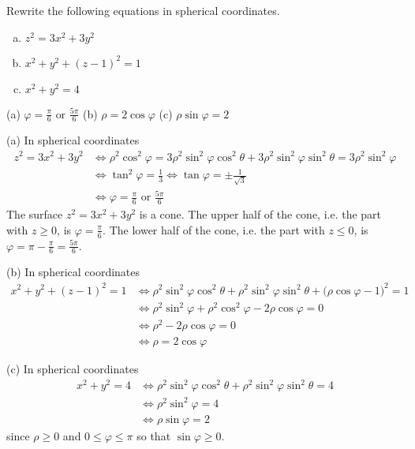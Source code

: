 \begin{question}
Rewrite the following equations in spherical coordinates.
\begin{enumerate}[(a)]
\item $z^2=3x^2+3y^2$
\item $x^2+y^2+(z-1)^2=1$
\item $x^2+y^2=4$
\end{enumerate}

\end{question}

%

\begin{answer}
(a) $\varphi=\frac{\pi}{6}\text{ or }\frac{5\pi}{6}$\qquad
(b) $\rho=2\cos\varphi$\qquad
(c) $\rho\sin\varphi=2$
\end{answer}

\begin{solution}
(a) In spherical coordinates
\begin{align*}
z^2=3x^2+3y^2
&\iff
\rho^2\cos^2\varphi = 3\rho^2\sin^2\varphi\cos^2\theta
                     +3\rho^2\sin^2\varphi\sin^2\theta 
                    =3\rho^2\sin^2\varphi \\
&\iff
\tan^2\varphi=\frac{1}{3}
\iff
\tan\varphi=\pm\frac{1}{\sqrt{3}} \\
&\iff \varphi=\frac{\pi}{6}\text{ or }\frac{5\pi}{6}
\end{align*}
The surface $z^2=3x^2+3y^2$ is a cone. The upper half of the cone,
i.e. the part with $z\ge 0$, is $\varphi=\frac{\pi}{6}$.
The lower half of the cone,
i.e. the part with $z\le 0$, is $\varphi=\pi-\frac{\pi}{6}=\frac{5\pi}{6}$.

(b) In spherical coordinates
\begin{align*}
x^2+y^2+(z-1)^2=1
&\iff
\rho^2\sin^2\varphi\cos^2\theta
    +\rho^2\sin^2\varphi\sin^2\theta 
    +\big(\rho\cos\varphi-1\big)^2
                    =1 \\
&\iff
\rho^2\sin^2\varphi 
    +\rho^2\cos^2\varphi-2\rho\cos\varphi
                    =0 \\
&\iff
\rho^2-2\rho\cos\varphi =0 \\
&\iff \rho=2\cos\varphi
\end{align*}

(c) In spherical coordinates
\begin{align*}
x^2+y^2=4
&\iff
\rho^2\sin^2\varphi\cos^2\theta
    +\rho^2\sin^2\varphi\sin^2\theta
                    =4 \\
&\iff
\rho^2\sin^2\varphi  =4 \\
&\iff
\rho\sin\varphi=2
\end{align*}
since $\rho\ge 0$ and $0\le\varphi\le\pi$ so that $\sin\varphi\ge 0$.

\end{solution}


